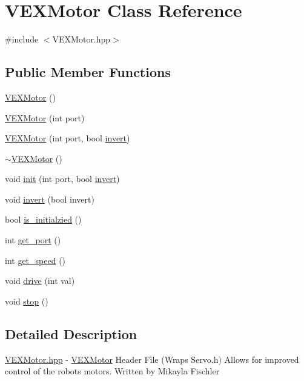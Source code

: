 \hypertarget{class_v_e_x_motor}{}\section{V\+E\+X\+Motor Class Reference}
\label{class_v_e_x_motor}


{\ttfamily \#include $<$V\+E\+X\+Motor.\+hpp$>$}

\subsection*{Public Member Functions}
\begin{DoxyCompactItemize}
\item 
\hyperlink{class_v_e_x_motor_ad8962ee0dee1654ed846df974c36e848}{V\+E\+X\+Motor} ()
\item 
\hyperlink{class_v_e_x_motor_a580907c6cae0d4f8c525c5ce5916c9f8}{V\+E\+X\+Motor} (int port)
\item 
\hyperlink{class_v_e_x_motor_a7de15da93ffb3034b3dc34d106b68ac6}{V\+E\+X\+Motor} (int port, bool \hyperlink{class_v_e_x_motor_a2c4c51b0b9c1c6747e0a8f1cee9f39e3}{invert})
\item 
\hyperlink{class_v_e_x_motor_a1f0c73e1feb9f1bbe6bcc1216e8de430}{$\sim$\+V\+E\+X\+Motor} ()
\item 
void \hyperlink{class_v_e_x_motor_a67dc328fafe4cd889b40a1147a0d4326}{init} (int port, bool \hyperlink{class_v_e_x_motor_a2c4c51b0b9c1c6747e0a8f1cee9f39e3}{invert})
\item 
void \hyperlink{class_v_e_x_motor_a2c4c51b0b9c1c6747e0a8f1cee9f39e3}{invert} (bool invert)
\item 
bool \hyperlink{class_v_e_x_motor_a426abe40a80c506b6f7297c070f109e2}{is\+\_\+initialzied} ()
\item 
int \hyperlink{class_v_e_x_motor_a3f4844099f5aff566f26645fd20bf8b2}{get\+\_\+port} ()
\item 
int \hyperlink{class_v_e_x_motor_af2e32fe5adc71a85977a728ba3531a96}{get\+\_\+speed} ()
\item 
void \hyperlink{class_v_e_x_motor_ac8ab5c30e4be4a9e3ed290e7827bcf1a}{drive} (int val)
\item 
void \hyperlink{class_v_e_x_motor_abb2dd7163f613f47b4c9e000b8214d6b}{stop} ()
\end{DoxyCompactItemize}


\subsection{Detailed Description}
\hyperlink{_v_e_x_motor_8hpp}{V\+E\+X\+Motor.\+hpp} -\/ \hyperlink{class_v_e_x_motor}{V\+E\+X\+Motor} Header File (Wraps Servo.\+h) Allows for improved control of the robot\textquotesingle{}s motors. Written by Mikayla Fischler 

